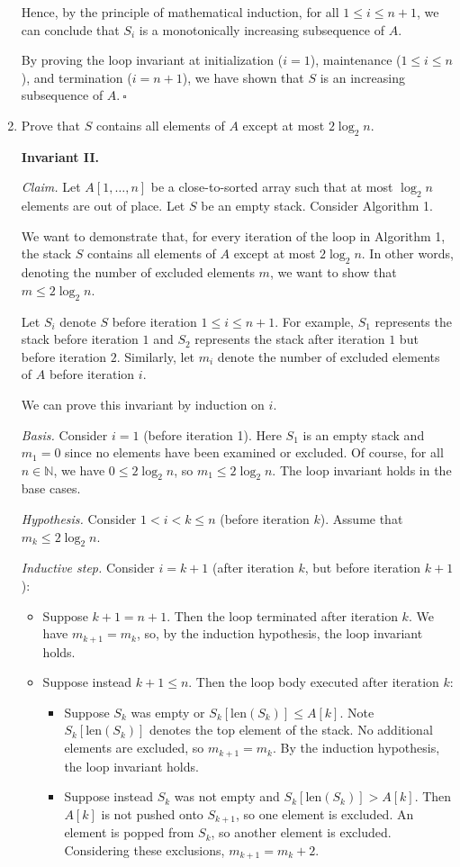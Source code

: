 \begin{enumerate}
\begin{solution}
Hence, by the principle of mathematical induction, for all $1\leq i\leq n+1$, we can conclude that $S_i$ is a monotonically increasing subsequence of $A$. 

By proving the loop invariant at initialization ($i=1$), maintenance ($1\leq i\leq n$), and termination ($i=n+1$), we have shown that $S$ is an increasing subsequence of $A$.$~\square$
\end{solution}
\newpage
\item Prove that $S$ contains all elements of $A$ except at most $2\log_2 n$.
\begin{solution}\textbf{Invariant II.}

\textit{Claim. }Let $A[1,\dots,n]$ be a close-to-sorted array such that at most $\log_2n$ elements are out of place. Let $S$ be an empty stack. Consider Algorithm 1.

We want to demonstrate that, for every iteration of the loop in Algorithm 1, the stack $S$ contains all elements of $A$ except at most $2\log_2n$. In other words, denoting the number of excluded elements $m$, we want to show that $m\leq 2\log_2n$.

Let $S_i$ denote $S$ before iteration $1\leq i\leq n+1$. For example, $S_1$ represents the stack before iteration $1$ and $S_2$ represents the stack after iteration $1$ but before iteration $2$. Similarly, let $m_i$ denote the number of excluded elements of $A$ before iteration $i$.

We can prove this invariant by induction on $i$.

\textit{Basis. }Consider $i=1$ (before iteration 1). Here $S_1$ is an empty stack and $m_1=0$ since no elements have been examined or excluded. Of course, for all $n\in\mathbb{N}$, we have $0\leq 2\log_2n$, so $m_1\leq 2\log_2n$. The loop invariant holds in the base cases.

\textit{Hypothesis. }Consider $1<i<k\leq n$ (before iteration $k$). Assume that $m_k\leq 2\log_2 n$.

\textit{Inductive step. }Consider $i=k+1$ (after iteration $k$, but before iteration $k+1$):
\begin{itemize}
\item Suppose $k+1=n+1$. Then the loop terminated after iteration $k$. We have $m_{k+1}=m_k$, so, by the induction hypothesis, the loop invariant holds.
\item Suppose instead $k+1\leq n$. Then the loop body executed after iteration $k$:
\begin{itemize}
\item Suppose $S_k$ was empty or $S_k[\text{len}(S_k)]\leq A[k]$. Note $S_k[\text{len}(S_k)]$ denotes the top element of the stack. No additional elements are excluded, so $m_{k+1}=m_k$. By the induction hypothesis, the loop invariant holds.
\item Suppose instead $S_k$ was not empty and $S_k[\text{len}(S_k)]>A[k]$. Then $A[k]$ is not pushed onto $S_{k+1}$, so one element is excluded. An element is popped from $S_k$, so another element is excluded. Considering these exclusions, $m_{k+1}=m_k+2$.


\end{itemize}
\end{itemize}
\end{solution}
\end{enumerate}
